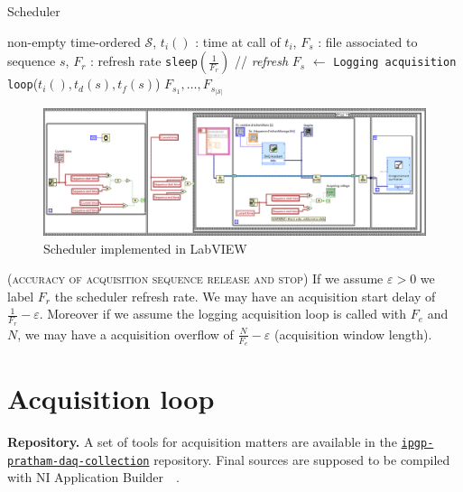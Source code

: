 \documentclass[a4paper]{report}
\newenvironment{remark}[1][Remark.]{\begin{trivlist}
\item[\hskip \labelsep {\bfseries #1}]}{\end{trivlist}}
\begin{document}
\begin{algorithm}[h]
\caption{Scheduler}
\label{algo_timer}
\begin{algorithmic}[1]
  \REQUIRE non-empty time-ordered $\mathcal{S}$, $t_i()$ : time at call of $t_i$, $F_s$ : file associated to sequence $s$, $F_r$ : refresh rate
  \STATE \texttt{sleep}$(\frac{1}{F_r})$ \hfill // \textit{refresh}
  \ENDWHILE
  \STATE $F_s$ $\leftarrow$ \texttt{Logging acquisition loop}($t_i (), t_d (s), t_f (s)$)
  \ENDFOR
  \RETURN $F_{s_1}, \dots, F_{s_{\left | \mathcal{S} \right |}}$
\end{algorithmic}
\end{algorithm}

\begin{figure}[h]
  \begin{center}
  \includegraphics[width=17.5cm]{pictures/minuterie.png}
  \end{center}
\caption{Scheduler implemented in LabVIEW}
\label{fig:algo_timer_labview}
\end{figure}

\begin{remark}
  \textsc{(accuracy of acquisition sequence release and stop)}
  If we assume $\varepsilon > 0$ we label $F_r$ the scheduler refresh rate. We may have an acquisition start delay of $\frac{1}{F_r} - \varepsilon$. Moreover if we assume the logging acquisition loop is called with $F_e$ and $N$, we may have a acquisition overflow of $\frac{N}{F_e} - \varepsilon$ (acquisition window length).
\end{remark}

\section{Acquisition loop}

\noindent
\textbf{Repository.} A set of tools for acquisition matters are available in the \href{https://github.com/EmptyStackExn/ipgp-pratham-daq-collection}{\texttt{ipgp-pratham-daq-collection}} repository. Final sources are supposed to be compiled with NI Application Builder~\cite{NI_compiler}~\cite{NI_application_builder}.
\end{document}
